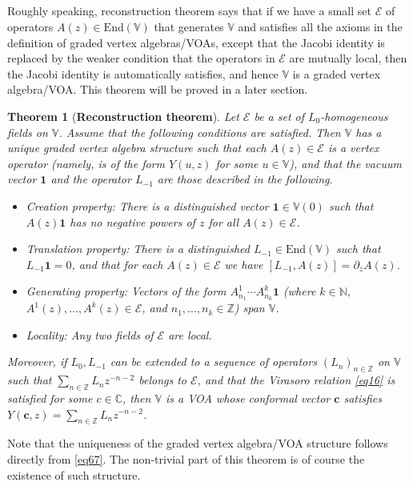 \documentclass[12pt,a4paper,notitlepage]{article}
\theoremstyle{definition}
\theoremstyle{plain}
\newtheorem{thm}[df]{Theorem}
\newcommand{\mc}{\mathcal}
\newcommand{\End}{\mathrm{End}} %
\newcommand{\id}{\mathbf{1}}
\newcommand{\Vbb}{\mathbb V}
\newcommand{\Cbb}{\mathbb C}
\newcommand{\Nbb}{\mathbb N}
\newcommand{\Zbb}{\mathbb Z}
\newcommand{\cbf}{\mathbf c}
\numberwithin{equation}{section}
\begin{document}
\subsection{}




Roughly speaking, reconstruction theorem says that if we have a small set $\mc E$ of operators $A(z)\in\End(\Vbb)$ that generates $\Vbb$ and satisfies all the axioms in the definition of graded vertex algebras/VOAs, except that the Jacobi identity is replaced by the weaker condition that the operators in $\mc E$ are mutually local, then the Jacobi identity is automatically satisfies, and hence $\Vbb$ is a graded vertex algebra/VOA. This theorem will be proved in a later section.


\begin{thm}[\textbf{Reconstruction theorem}]\label{lb39}
Let $\mc E$ be a set of $L_0$-homogeneous fields on $\Vbb$.  Assume that the following conditions are satisfied. Then $\Vbb$ has a unique graded vertex algebra structure such that each $A(z)\in\mc E$ is a vertex operator (namely, is of the form $Y(u,z)$ for some $u\in\Vbb$), and that the vacuum vector $\id$ and the operator $L_{-1}$  are those described in the following.
\begin{itemize}
\item Creation property: There is a distinguished vector $\id\in\Vbb(0)$ such that $A(z)\id$ has no negative powers of $z$ for all $A(z)\in\mc E$.
\item Translation property: There is a distinguished $L_{-1}\in\End(\Vbb)$ such that $L_{-1}\id=0$, and that for each $A(z)\in\mc E$ we have $[L_{-1},A(z)]=\partial_zA(z)$.
\item Generating property: Vectors of the form $A^1_{n_1}\cdots A^k_{n_k}\id$ (where $k\in\Nbb$, $A^1(z),\dots,A^k(z)\in\mc E$, and $n_1,\dots,n_k\in\Zbb$) span $\Vbb$. 
\item Locality: Any two fields of $\mc E$ are local.
\end{itemize}
Moreover, if $L_0,L_{-1}$ can be extended to a sequence of operators $(L_n)_{n\in\Zbb}$ on $\Vbb$ such that $\sum_{n\in\Zbb}L_nz^{-n-2}$ belongs to $\mc E$, and that the Virasoro relation \eqref{eq16} is satisfied for some $c\in\Cbb$, then $\Vbb$ is a VOA whose conformal vector $\cbf$ satisfies $Y(\cbf,z)=\sum_{n\in\Zbb}L_nz^{-n-2}$.
\end{thm}
Note that the uniqueness of the graded vertex algebra/VOA structure follows directly from \eqref{eq67}. The non-trivial part of this theorem is of course the existence of such structure.
\end{document}
